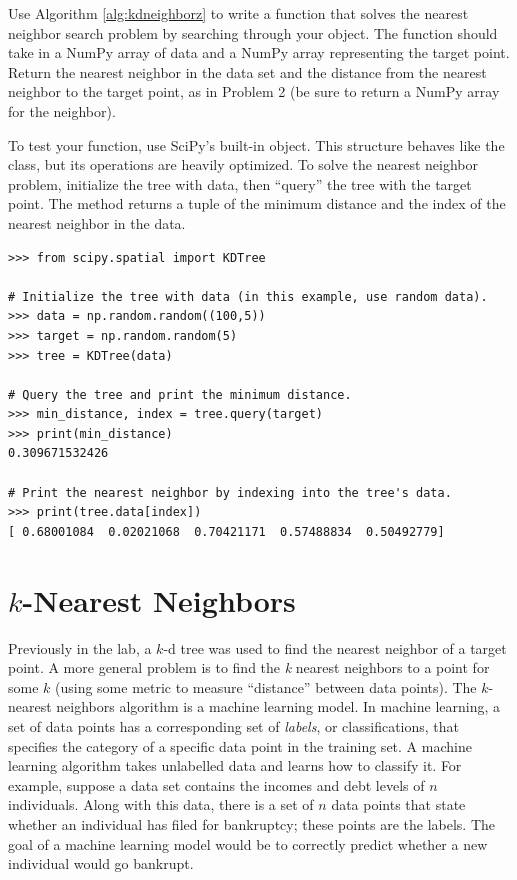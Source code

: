 \begin{problem} %
Use Algorithm \ref{alg:kdneighborz} to write a function that solves the nearest neighbor search problem by searching through your  object.
The function should take in a NumPy array of data and a NumPy array representing the target point.
Return the nearest neighbor in the data set and the distance from the nearest neighbor to the target point, as in Problem 2 (be sure to return a NumPy array for the neighbor).

To test your function, use SciPy's built-in  object.
This structure behaves like the  class, but its operations are heavily optimized.
To solve the nearest neighbor problem, initialize the tree with data, then ``query'' the tree with the target point.
The  method returns a tuple of the minimum distance and the index of the nearest neighbor in the data.

\begin{lstlisting}
>>> from scipy.spatial import KDTree

# Initialize the tree with data (in this example, use random data).
>>> data = np.random.random((100,5))
>>> target = np.random.random(5)
>>> tree = KDTree(data)

# Query the tree and print the minimum distance.
>>> min_distance, index = tree.query(target)
>>> print(min_distance)
0.309671532426

# Print the nearest neighbor by indexing into the tree's data.
>>> print(tree.data[index])
[ 0.68001084  0.02021068  0.70421171  0.57488834  0.50492779]
\end{lstlisting}
\end{problem}

\section*{$k$-Nearest Neighbors}
Previously in the lab, a $k$-d tree was used to find the nearest neighbor of a target point.
A more general problem is to find the \emph{k} nearest neighbors to a point for some $k$ (using some metric to measure ``distance'' between data points).
The $k$-nearest neighbors algorithm is a machine learning model. %
In machine learning, a set of data points has a corresponding set of \emph{labels}, or classifications, that specifies the category of a specific data point in the training set.
A machine learning algorithm takes unlabelled data and learns how to classify it.
For example, suppose a data set contains the incomes and debt levels of $n$ individuals.
Along with this data, there is a set of $n$ data points that state whether an individual has filed for bankruptcy; these points are the labels.
The goal of a machine learning model would be to correctly predict whether a new individual would go bankrupt.

